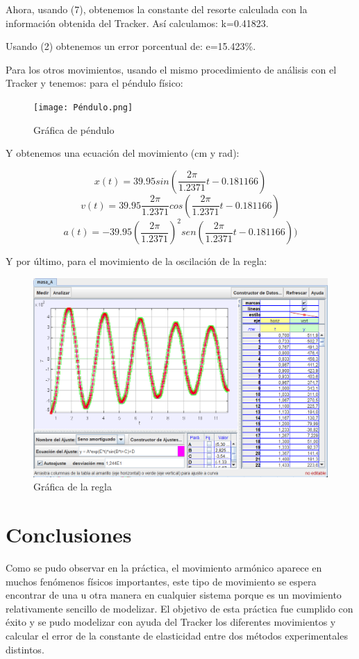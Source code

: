 \documentclass[a4paper]{article}
\begin{document}
Ahora, usando (7), obtenemos la constante del resorte calculada con la información obtenida del Tracker. Así calculamos: k=0.41823.

Usando (2) obtenemos un error porcentual de: e=15.423\%.

Para los otros movimientos, usando el mismo procedimiento de análisis con el Tracker y tenemos: para el péndulo físico:

\begin{figure} [H] 
    \centering
    \texttt{[image: Péndulo.png]}
    \caption{Gráfica de péndulo}
    \label{Péndulo}
\end{figure}

Y obtenemos una ecuación del movimiento (cm y rad):

\[x(t)=39.95sin(\frac{2\pi}{1.2371} t -0.181166)\]
\[v(t)=39.95\frac{2\pi}{1.2371}cos(\frac{2\pi}{1.2371} t -0.181166)\]
\[a(t)=-39.95(\frac{2\pi}{1.2371})^2sen(\frac{2\pi}{1.2371} t -0.181166))\]

Y por último, para el movimiento de la oscilación de la regla:

\begin{figure} [H] 
    \centering
    \includegraphics[scale=0.5]{Regla.png}
    \caption{Gráfica de la regla}
    \label{Regla}
\end{figure}

\section{Conclusiones}
Como se pudo observar en la práctica, el movimiento armónico aparece en muchos fenómenos físicos importantes, este tipo de movimiento se espera encontrar de una u otra manera en cualquier sistema porque es un movimiento relativamente sencillo de modelizar. El objetivo de esta práctica fue cumplido con éxito y se pudo modelizar con ayuda del Tracker los diferentes movimientos y calcular el error de la constante de elasticidad entre dos métodos experimentales distintos.
\end{document}
